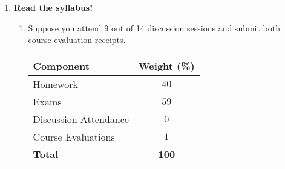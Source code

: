 \documentclass{article}
\begin{document}
\begin{enumerate}
\begin{verbatim}
    \item \textbf{Fibonacci Numbers.} \\
    The Fibonacci numbers may be defined by the recurrence relation
    \[
    F_n = F_{n-1} + F_{n-2}
    \]
    with base cases $F_0 = 0$ and $F_1 = 1$. We can compute the $n$-th Fibonacci number using the following recursive algorithm:

    \begin{minipage}{\linewidth}
    \begin{algorithm}[H]
        \begin{algorithmic}[1]
            \Require{a natural number $n$}
            \Ensure{the $n$-th Fibonacci number}
            \Function{\text{Fib}}{$n$}
                \If{$n = 0$}
                    \State \Return $0$
                \EndIf
                \If{$n = 1$}
                    \State \Return $1$
                \EndIf
                \State \Return $\text{Fib}(n-1) + \text{Fib}(n-2)$
            \EndFunction
        \end{algorithmic}
    \end{algorithm}
    \end{minipage}
\end{enumerate}
    \end{verbatim}
    \pagebreak


    \item \textbf{Read the syllabus!}
    \begin {enumerate}
        \item Suppose you attend 9 out of 14 discussion sessions and submit both course evaluation receipts.
        \begin{center}
            \renewcommand{\arraystretch}{1.2}
            \begin{tabular}{|l|c|}
            \hline
            \textbf{Component}         & \textbf{Weight (\%)} \\ \hline
            Homework                   & $40$ \\ \hline
            Exams                      & $59$ \\ \hline
            Discussion Attendance      & $0$ \\ \hline
            Course Evaluations         & $1$ \\ \hline
            \textbf{Total}             & \textbf{100}       \\ \hline
            \end{tabular}
        \end{center}




\end{enumerate}
\end{enumerate}
\end{document}
